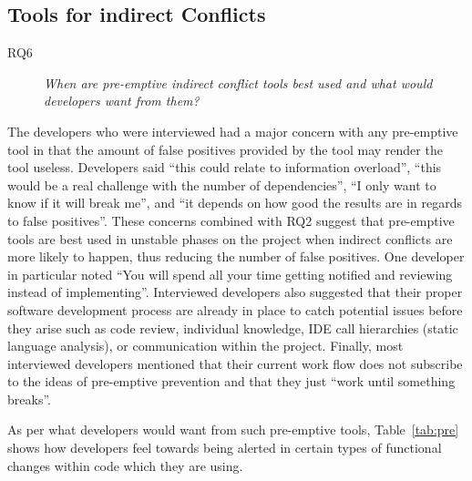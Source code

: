 \documentclass[conference]{IEEEtran}
\begin{document}
\subsection{Tools for indirect Conflicts}

\begin{description}
	\item[RQ6] \textit{When are pre-emptive indirect conflict tools best used and what would developers want from them?}
\end{description}

The developers who were interviewed had a major concern with any pre-emptive tool in that the amount of false positives
provided by the tool may render the tool useless. Developers said ``this could relate to information overload'', ``this would
be a real challenge with the number of dependencies'', ``I only want to know if it will break me'', and ``it depends on how
good the results are in regards to false positives''. These concerns combined with RQ2 suggest that pre-emptive tools are
best used in unstable phases on the project when indirect conflicts are more likely to happen, thus reducing the number of false
positives. One developer in particular noted ``You will spend all your time getting notified and reviewing instead of implementing''.
Interviewed developers also suggested that their proper software development process are already in place to
catch potential issues before they arise such as code review, individual knowledge, IDE call hierarchies (static language analysis),
or communication within the project. Finally, most interviewed developers mentioned that their current work flow does
not subscribe to the ideas of pre-emptive prevention and that they just ``work until something breaks''. 

As per what developers would want from such pre-emptive tools, Table~\ref{tab:pre} shows how developers feel towards being 
alerted in certain types of functional changes within code which they are using.
\end{document}

